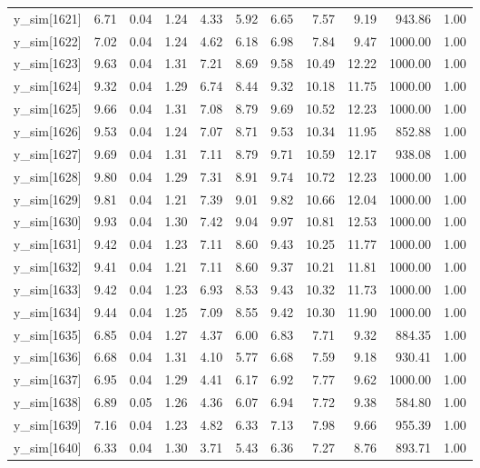 \begin{table}[ht]
\begin{tabular}{rrrrrrrrrrr}
  y\_sim[1621] & 6.71 & 0.04 & 1.24 & 4.33 & 5.92 & 6.65 & 7.57 & 9.19 & 943.86 & 1.00 \\ 
  y\_sim[1622] & 7.02 & 0.04 & 1.24 & 4.62 & 6.18 & 6.98 & 7.84 & 9.47 & 1000.00 & 1.00 \\ 
  y\_sim[1623] & 9.63 & 0.04 & 1.31 & 7.21 & 8.69 & 9.58 & 10.49 & 12.22 & 1000.00 & 1.00 \\ 
  y\_sim[1624] & 9.32 & 0.04 & 1.29 & 6.74 & 8.44 & 9.32 & 10.18 & 11.75 & 1000.00 & 1.00 \\ 
  y\_sim[1625] & 9.66 & 0.04 & 1.31 & 7.08 & 8.79 & 9.69 & 10.52 & 12.23 & 1000.00 & 1.00 \\ 
  y\_sim[1626] & 9.53 & 0.04 & 1.24 & 7.07 & 8.71 & 9.53 & 10.34 & 11.95 & 852.88 & 1.00 \\ 
  y\_sim[1627] & 9.69 & 0.04 & 1.31 & 7.11 & 8.79 & 9.71 & 10.59 & 12.17 & 938.08 & 1.00 \\ 
  y\_sim[1628] & 9.80 & 0.04 & 1.29 & 7.31 & 8.91 & 9.74 & 10.72 & 12.23 & 1000.00 & 1.00 \\ 
  y\_sim[1629] & 9.81 & 0.04 & 1.21 & 7.39 & 9.01 & 9.82 & 10.66 & 12.04 & 1000.00 & 1.00 \\ 
  y\_sim[1630] & 9.93 & 0.04 & 1.30 & 7.42 & 9.04 & 9.97 & 10.81 & 12.53 & 1000.00 & 1.00 \\ 
  y\_sim[1631] & 9.42 & 0.04 & 1.23 & 7.11 & 8.60 & 9.43 & 10.25 & 11.77 & 1000.00 & 1.00 \\ 
  y\_sim[1632] & 9.41 & 0.04 & 1.21 & 7.11 & 8.60 & 9.37 & 10.21 & 11.81 & 1000.00 & 1.00 \\ 
  y\_sim[1633] & 9.42 & 0.04 & 1.23 & 6.93 & 8.53 & 9.43 & 10.32 & 11.73 & 1000.00 & 1.00 \\ 
  y\_sim[1634] & 9.44 & 0.04 & 1.25 & 7.09 & 8.55 & 9.42 & 10.30 & 11.90 & 1000.00 & 1.00 \\ 
  y\_sim[1635] & 6.85 & 0.04 & 1.27 & 4.37 & 6.00 & 6.83 & 7.71 & 9.32 & 884.35 & 1.00 \\ 
  y\_sim[1636] & 6.68 & 0.04 & 1.31 & 4.10 & 5.77 & 6.68 & 7.59 & 9.18 & 930.41 & 1.00 \\ 
  y\_sim[1637] & 6.95 & 0.04 & 1.29 & 4.41 & 6.17 & 6.92 & 7.77 & 9.62 & 1000.00 & 1.00 \\ 
  y\_sim[1638] & 6.89 & 0.05 & 1.26 & 4.36 & 6.07 & 6.94 & 7.72 & 9.38 & 584.80 & 1.00 \\ 
  y\_sim[1639] & 7.16 & 0.04 & 1.23 & 4.82 & 6.33 & 7.13 & 7.98 & 9.66 & 955.39 & 1.00 \\ 
  y\_sim[1640] & 6.33 & 0.04 & 1.30 & 3.71 & 5.43 & 6.36 & 7.27 & 8.76 & 893.71 & 1.00 \\ 

\end{tabular}
\end{table}
